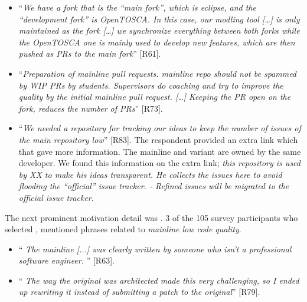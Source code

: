 \begin{itemize}[leftmargin=*]
\item ``\emph{We have a fork that is the ``main fork'', which is eclipse, and the ``development fork'' is OpenTOSCA. In this case, our modling tool [\ldots] is only maintained as the fork [\ldots] we synchronize everything between both forks while the OpenTOSCA one is mainly used to develop new features, which are then pushed as PRs to the main fork}'' [R61].

\item ``\emph{Preparation of mainline pull requests. mainline repo should not be spammed by WIP PRs by students. Supervisors do coaching and try to improve the quality by the initial mainline pull request. [\dots] Keeping the PR open on the fork, reduces the number of PRs}'' [R73].

\item ``\emph{We needed a repository for tracking our ideas to keep the number of issues of the main repository low}'' [R83]. The respondent provided an extra link which that gave more information. The mainline and variant are owned by the same developer. We found this information on the extra link; \emph{this repository is used by XX to make his ideas transparent. He collects the issues here to avoid flooding the ``official'' issue tracker. - Refined issues will be migrated to the official issue tracker}.
\end{itemize}

\nd The next prominent  motivation detail was .
3 of the 105 survey participants who selected , mentioned phrases related to \emph{mainline low code quality}.

\begin{itemize}[leftmargin=*]
\item ``\emph{%
The mainline [...] %
was clearly written by someone who isn't a professional software engineer.%
}'' [R63].

\item ``\emph{%
The way the original was architected made this very challenging, so I ended up rewriting it instead of submitting a patch to the original}'' [R79].
\end{itemize}


